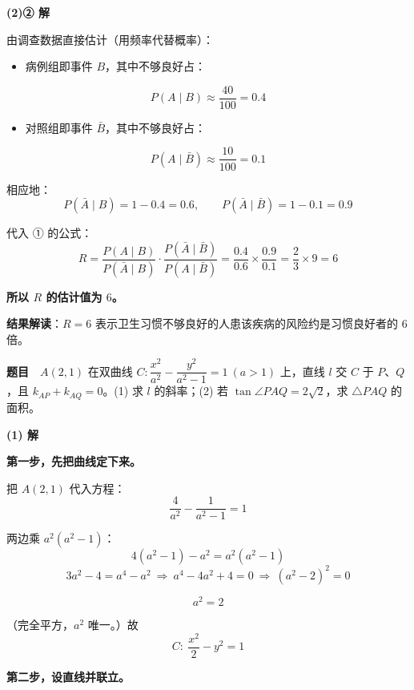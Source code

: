 \par\medskip

\textbf{(2)② 解}

由调查数据直接估计（用频率代替概率）：

\begin{itemize}
\item 病例组即事件 $B$，其中不够良好占：
\end{itemize}
\[P(A\mid B)\approx\frac{40}{100}=0.4\]

\begin{itemize}
\item 对照组即事件 $\bar B$，其中不够良好占：
\end{itemize}
\[P(A\mid\bar B)\approx\frac{10}{100}=0.1\]

相应地：
\[P(\bar A\mid B)=1-0.4=0.6,\qquad P(\bar A\mid\bar B)=1-0.1=0.9\]

代入 ① 的公式：
\[R=\frac{P(A\mid B)}{P(\bar A\mid B)}\cdot\frac{P(\bar A\mid\bar B)}{P(A\mid\bar B)}=\frac{0.4}{0.6}\times\frac{0.9}{0.1}=\frac23\times9=6\]

\textbf{所以 $R$ 的估计值为 $6$。}

\begin{gktip}
\textbf{结果解读}：$R=6$ 表示卫生习惯不够良好的人患该疾病的风险约是习惯良好者的 $6$ 倍。
\end{gktip}

\par\medskip


\textbf{题目}　$A(2,1)$ 在双曲线 $C:\dfrac{x^{2}}{a^{2}}-\dfrac{y^{2}}{a^{2}-1}=1\ (a>1)$ 上，直线 $l$ 交 $C$ 于 $P$、$Q$，且 $k_{AP}+k_{AQ}=0$。(1) 求 $l$ 的斜率；(2) 若 $\tan\angle PAQ=2\sqrt2$，求 $\triangle PAQ$ 的面积。

\par\medskip

\textbf{(1) 解}

\textbf{第一步，先把曲线定下来。}

把 $A(2,1)$ 代入方程：
\[\frac4{a^{2}}-\frac1{a^{2}-1}=1\]

两边乘 $a^{2}\left(a^{2}-1\right)$：
\[4\left(a^{2}-1\right)-a^{2}=a^{2}\left(a^{2}-1\right)\]
\[3a^{2}-4=a^{4}-a^{2}\ \Longrightarrow\ a^{4}-4a^{2}+4=0\ \Longrightarrow\ \left(a^{2}-2\right)^{2}=0\]

\[a^{2}=2\]

（完全平方，$a^2$ 唯一。）故
\[C:\ \frac{x^{2}}2-y^{2}=1\]

\textbf{第二步，设直线并联立。}

